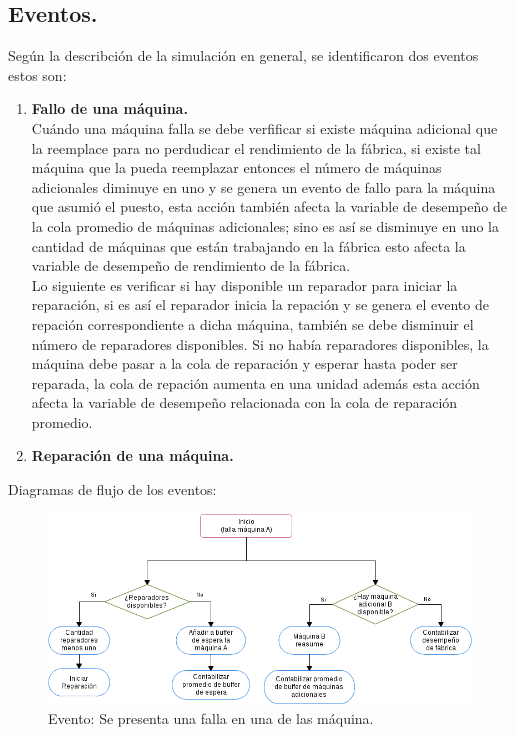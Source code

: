 \documentclass[10pt]{article}
\begin{document}
\newpage 


\subsection{Eventos.}

Según la describción de la simulaci\'on en general, se identificaron dos eventos estos son:

\begin{enumerate}
\item \textbf{Fallo de una máquina.}\\
Cuándo una máquina falla se debe verfificar si existe máquina adicional que la reemplace para no perdudicar el rendimiento de la fábrica, si existe tal máquina que la pueda reemplazar entonces el número de m\'aquinas adicionales diminuye en uno y se genera un evento de fallo para la m\'aquina que asumi\'o el puesto, esta acci\'on tambi\'en afecta la variable de desempeño de la cola promedio de m\'aquinas adicionales; sino es as\'i se disminuye en uno la cantidad de m\'aquinas que est\'an trabajando en la f\'abrica esto afecta la variable de desempeño de rendimiento de la f\'abrica. \\

Lo siguiente es verificar si hay disponible un reparador para iniciar la reparaci\'on, si es as\'i el reparador inicia la repaci\'on y se genera el evento de repaci\'on correspondiente a dicha m\'aquina, tambi\'en se debe disminuir el n\'umero de reparadores disponibles. Si no hab\'ia reparadores disponibles, la m\'aquina debe pasar a la cola de reparaci\'on y esperar hasta poder ser reparada, la cola de repaci\'on aumenta en una unidad adem\'as esta acci\'on afecta la variable de desempeño relacionada con la cola de reparaci\'on promedio.


\item \textbf{Reparación de una máquina.}

\end{enumerate}


Diagramas de flujo de los eventos:

\newpage 

\begin{figure}
  \centering
  	\includegraphics[scale=0.5]{EventoFallo.png} 
  \caption{Evento: Se presenta una falla en una de las máquina.}
  \label{fig:eventofallo}
\end{figure}
\end{document}
